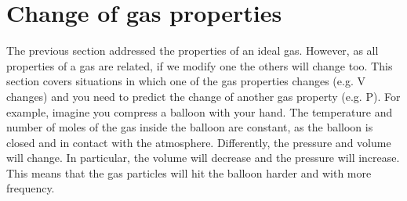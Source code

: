 \documentclass[main.tex]{subfiles}
\begin{document}
\section{Change of gas properties}
The previous section addressed the properties of an ideal gas.  However, as all properties of a gas are related, if we modify one the others will change too. This section covers situations in which one of the gas properties changes (e.g. V changes) and you need to predict the change of another gas property (e.g. P). For example, imagine you compress a balloon with your hand. The temperature and number of moles of the gas inside the balloon are constant, as the balloon is closed and in contact with the atmosphere. Differently, the pressure and volume will change. In particular, the volume will decrease and the pressure will increase. This means that the gas particles will hit the balloon harder and with more frequency.
\sloppy 
\end{document}
